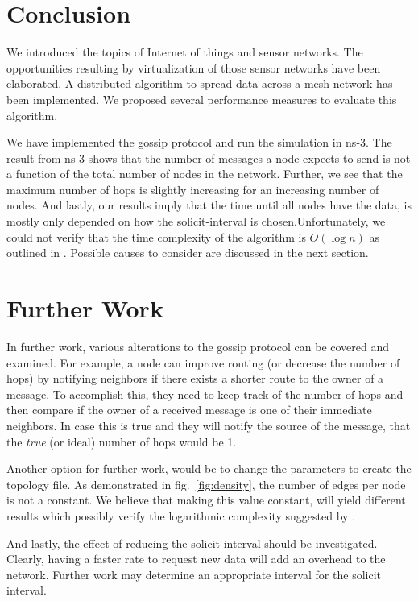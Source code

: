 \documentclass[12pt,journal]{IEEEtran}
\begin{document}
\section{Conclusion}
We introduced the topics of Internet of things and sensor networks. The opportunities resulting by virtualization of those sensor networks have been elaborated. A distributed algorithm to spread data across a mesh-network has been implemented. We proposed several performance measures to evaluate this algorithm.

We have implemented the gossip protocol and run the simulation in ns-3. The result from ns-3 shows that the number of messages a node expects to send is not a function of the total number of nodes in the network. Further, we see that the maximum number of hops is slightly increasing for an increasing number of nodes. And lastly, our results imply that the time until all nodes have the data, is mostly only depended on how the solicit-interval is chosen.Unfortunately, we could not verify that the time complexity of the algorithm is $O(\log n)$ as outlined in \cite{gossip}. Possible causes to consider are discussed in the next section.

\section{Further Work}\label{sec:further}
In further work, various alterations to the gossip protocol can be covered and examined. For example, a node can improve routing (or decrease the number of hops) by notifying neighbors if there exists a shorter route to the owner of a message. To accomplish this, they need to keep track of the number of hops and then compare if the owner of a received message is one of their immediate neighbors. In case this is true and they will notify the source of the message, that the \textit{true} (or ideal) number of hops would be 1.

Another option for further work, would be to change the parameters to create the topology file. As demonstrated in fig.~\ref{fig:density}, the number of edges per node is not a constant. We believe that making this value constant, will yield different results which possibly verify the logarithmic complexity suggested by \cite{gossip}.

And lastly, the effect of reducing the solicit interval should be investigated. Clearly, having a faster rate to request new data will add an overhead to the network. Further work may determine an appropriate interval for the solicit interval.
\end{document}
